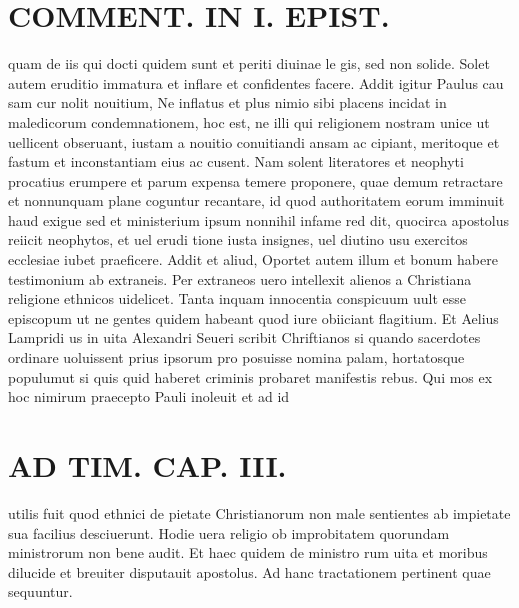\documentclass{article}
\begin{document}
\begin{pages}
\section*{COMMENT. IN I. EPIST. }\pstart quam de iis qui docti quidem sunt et periti diuinae le gis, sed non solide. Solet autem eruditio immatura et inflare et confidentes facere. Addit igitur Paulus cau sam cur nolit nouitium, Ne inflatus et plus nimio sibi placens incidat in maledicorum condemnationem, hoc est, ne illi qui religionem nostram unice ut uellicent obseruant, iustam a nouitio conuitiandi ansam ac cipiant, meritoque et fastum et inconstantiam eius ac cusent. Nam solent literatores et neophyti procatius erumpere et parum expensa temere proponere, quae demum retractare et nonnunquam plane coguntur recantare, id quod authoritatem eorum imminuit haud exigue sed et ministerium ipsum nonnihil infame red dit, quocirca apostolus reiicit neophytos, et uel erudi tione iusta insignes, uel diutino usu exercitos ecclesiae iubet praeficere. Addit et aliud, Oportet autem illum et bonum habere testimonium ab extraneis. Per extraneos uero intellexit alienos a Christiana religione ethnicos uidelicet. Tanta inquam innocentia conspicuum uult esse episcopum ut ne gentes quidem habeant quod iure obiiciant flagitium. Et Aelius Lampridi us in uita Alexandri Seueri scribit Chriftianos si quando sacerdotes ordinare uoluissent prius ipsorum pro posuisse nomina palam, hortatosque populumut si quis quid haberet criminis probaret manifestis rebus. Qui mos ex hoc nimirum praecepto Pauli inoleuit et ad id  \pend
\section*{AD TIM. CAP. III. }
\marginpar{[ p.130 ]}\pstart utilis fuit quod ethnici de pietate Christianorum non male sentientes ab impietate sua facilius desciuerunt. Hodie uera religio ob improbitatem quorundam ministrorum non bene audit. Et haec quidem de ministro rum uita et moribus dilucide et breuiter disputauit apostolus. Ad hanc tractationem pertinent quae sequuntur.  \pend
{}
{}

\end{pages}
\end{document}
